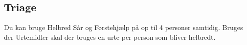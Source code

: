 \subsection*{Triage}
Du kan bruge Helbred Sår og Førstehjælp på op til 4 personer samtidig. Bruges der Urtemidler skal der bruges en urte per person som bliver helbredt.
